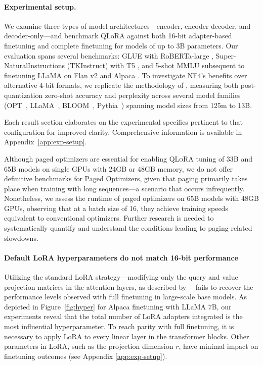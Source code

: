\paragraph{Experimental setup.} We examine three types of model architectures—encoder, encoder-decoder, and decoder-only—and benchmark QLoRA against both 16-bit adapter-based finetuning and complete finetuning for models of up to 3B parameters. Our evaluation spans several benchmarks: GLUE \citep{wang2018glue} with RoBERTa-large \citep{liu2019roberta}, Super-NaturalInstructions (TKInstruct) \citep{wang2022super} with T5 \citep{t5}, and 5-shot MMLU \citep{hendrycksmeasuring} subsequent to finetuning LLaMA on Flan v2 \citep{longpre2023flan} and Alpaca \citep{alpaca}. To investigate NF4’s benefits over alternative 4-bit formats, we replicate the methodology of \citet{dettmers2022case}, measuring both post-quantization zero-shot accuracy and perplexity across several model families (OPT~\citep{zhang2022opt}, LLaMA~\citep{touvron2023llama}, BLOOM~\citep{scao2022bloom}, Pythia~\citep{biderman2023pythia}) spanning model sizes from 125m to 13B.

Each result section elaborates on the experimental specifics pertinent to that configuration for improved clarity. Comprehensive information is available in Appendix~\ref{app:exp-setup}.

Although paged optimizers are essential for enabling \textsc{QLoRA} tuning of 33B and 65B models on single GPUs with 24GB or 48GB memory, we do not offer definitive benchmarks for Paged Optimizers, given that paging primarily takes place when training with long sequences—a scenario that occurs infrequently. Nonetheless, we assess the runtime of paged optimizers on 65B models with 48GB GPUs, observing that at a batch size of 16, they achieve training speeds equivalent to conventional optimizers. Further research is needed to systematically quantify and understand the conditions leading to paging-related slowdowns.

\paragraph{Default LoRA hyperparameters do not match 16-bit performance}

Utilizing the standard LoRA strategy—modifying only the query and value projection matrices in the attention layers, as described by \citet{hu2021lora}—fails to recover the performance levels observed with full finetuning in large-scale base models. As depicted in Figure~\ref{fig:hyper} for Alpaca finetuning with LLaMA 7B, our experiments reveal that the total number of LoRA adapters integrated is the most influential hyperparameter. To reach parity with full finetuning, it is necessary to apply LoRA to every linear layer in the transformer blocks. Other parameters in LoRA, such as the projection dimension $r$, have minimal impact on finetuning outcomes (see Appendix \ref{app:exp-setup}).

